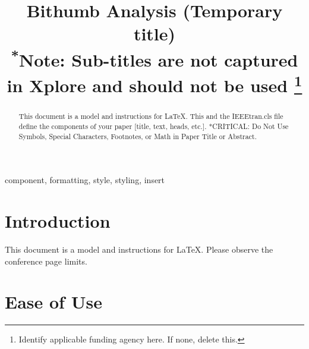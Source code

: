 \documentclass[conference]{IEEEtran}
\begin{document}
\title{Bithumb Analysis (Temporary title)\\
{\footnotesize \textsuperscript{*}Note: Sub-titles are not captured in Xplore and
should not be used}
\thanks{Identify applicable funding agency here. If none, delete this.}
}

\author{
\and
{}
\and
{}
}

\maketitle

\begin{abstract}
This document is a model and instructions for \LaTeX.
This and the IEEEtran.cls file define the components of your paper [title, text, heads, etc.]. *CRITICAL: Do Not Use Symbols, Special Characters, Footnotes, 
or Math in Paper Title or Abstract.
\end{abstract}

\begin{IEEEkeywords}
component, formatting, style, styling, insert
\end{IEEEkeywords}

\section{Introduction}
This document is a model and instructions for \LaTeX.
Please observe the conference page limits. 

\section{Ease of Use}
\end{document}
